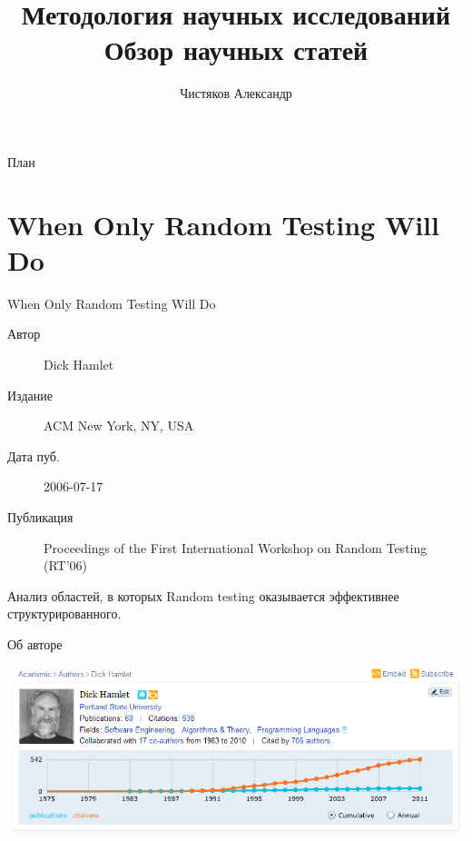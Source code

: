 \documentclass[11pt,pdf,hyperref=unicode,hyperref={bookmarks=false}]{beamer}
\author{Чистяков Александр}
\institute{группа 5126}
\title[Обзор научных статей]{Методология научных исследований\\ Обзор научных статей}
\begin{document}
    \begin{frame}
        \maketitle
    \end{frame}
    \begin{frame}{План}
        \tableofcontents
    \end{frame}
    \section{When Only Random Testing Will Do}
        \begin{frame}{When Only Random Testing Will Do}
            \begin{description}
                \item[Автор] Dick Hamlet
                \item[Издание] ACM New York, NY, USA 
                \item[Дата пуб.] 2006-07-17
                \item[Публикация] Proceedings of the First International Workshop on Random Testing (RT’06)
            \end{description}
Анализ областей, в которых Random testing оказывается эффективнее структурированного.
        \end{frame}
        \begin{frame}{Об авторе}
            \begin{center}
                \includegraphics[keepaspectratio=true,width=\textwidth,height=0.8\textheight]{hamlet3.png}\\
            \end{center}
        \end{frame}
\end{document}
